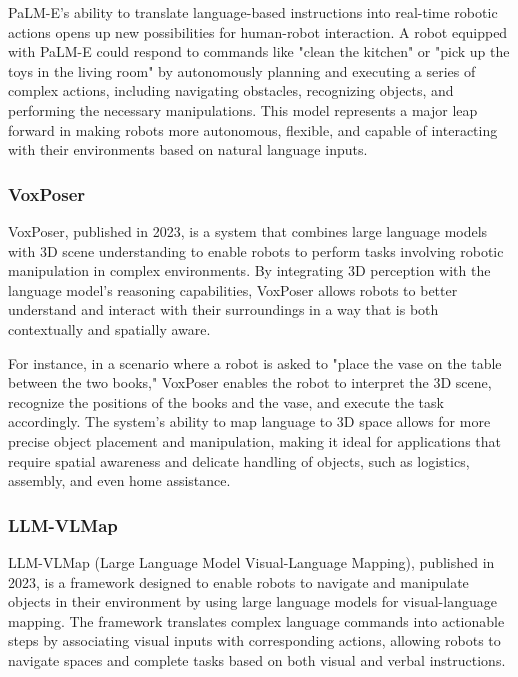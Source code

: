 PaLM-E’s ability to translate language-based instructions into real-time robotic actions opens up new possibilities for human-robot interaction. 
A robot equipped with PaLM-E could respond to commands like "clean the kitchen" or "pick up the toys in the living room" by autonomously planning and executing a series of complex actions, including navigating obstacles, recognizing objects, and performing the necessary manipulations. 
This model represents a major leap forward in making robots more autonomous, flexible, and capable of interacting with their environments based on natural language inputs.

\subsubsection{VoxPoser}

VoxPoser, published in 2023, is a system that combines large language models with 3D scene understanding to enable robots to perform tasks involving robotic manipulation in complex environments. 
By integrating 3D perception with the language model's reasoning capabilities, VoxPoser allows robots to better understand and interact with their surroundings in a way that is both contextually and spatially aware.

For instance, in a scenario where a robot is asked to "place the vase on the table between the two books," VoxPoser enables the robot to interpret the 3D scene, recognize the positions of the books and the vase, and execute the task accordingly. 
The system’s ability to map language to 3D space allows for more precise object placement and manipulation, making it ideal for applications that require spatial awareness and delicate handling of objects, such as logistics, assembly, and even home assistance.

\subsubsection{LLM-VLMap}

LLM-VLMap (Large Language Model Visual-Language Mapping), published in 2023, is a framework designed to enable robots to navigate and manipulate objects in their environment by using large language models for visual-language mapping. 
The framework translates complex language commands into actionable steps by associating visual inputs with corresponding actions, allowing robots to navigate spaces and complete tasks based on both visual and verbal instructions.


